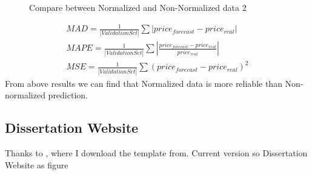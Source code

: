 \documentclass[12pt,a4paper]{scrartcl}
\begin{document}
	\begin{figure}[ht]
		\centering
		\caption{Compare between Normalized and Non-Normalized data 2}
		\label{fig:mse_mad}
	\end{figure}
	\begin{gather}
	\label{eq:MAD}
	MAD = \frac{1}{|ValidationSet|}\sum|price_{forecast}-price_{real}|\\
	\label{eq:MAPE}
	MAPE = \frac{1}{|ValidationSet|}\sum|\frac{price_{forecast}-price_{real}}{price_{real}}|\\
	\label{eq:MSE}
	MSE = \frac{1}{|ValidationSet|}\sum(price_{forecast}-price_{real})^2
	\end{gather}
	From above results we can find that Normalized data is more reliable than Non-normalized prediction.
	\subsection{Dissertation Website}
	Thanks to \cite{1_miller_2016}, where I download the template from. Current version so Dissertation Website as figure~
\end{document}
